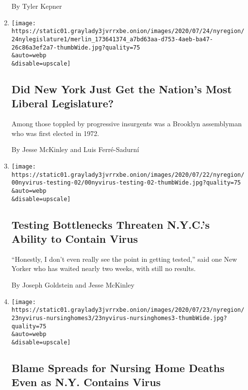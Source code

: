 \begin{enumerate}
  By Tyler Kepner
\item
  \href{/2020/07/24/nyregion/progressive-primaries-ny-legislature.html}{}

  \texttt{[image: https://static01.graylady3jvrrxbe.onion/images/2020/07/24/nyregion/24nylegislature1/merlin\_173641374\_a7bd63aa-d753-4aeb-ba47-26c86a3ef2a7-thumbWide.jpg?quality=75\\\&auto=webp\\\&disable=upscale]}

  \hypertarget{did-new-york-just-get-the-nations-most-liberal-legislature}{%
  \subsection{Did New York Just Get the Nation's Most Liberal
  Legislature?}\label{did-new-york-just-get-the-nations-most-liberal-legislature}}

  Among those toppled by progressive insurgents was a Brooklyn
  assemblyman who was first elected in 1972.

  By Jesse McKinley and Luis Ferré-Sadurní
\item
  \href{/2020/07/23/nyregion/coronavirus-testing-nyc.html}{}

  \texttt{[image: https://static01.graylady3jvrrxbe.onion/images/2020/07/22/nyregion/00nyvirus-testing-02/00nyvirus-testing-02-thumbWide.jpg?quality=75\\\&auto=webp\\\&disable=upscale]}

  \hypertarget{testing-bottlenecks-threaten-nycs-ability-to-contain-virus}{%
  \subsection{Testing Bottlenecks Threaten N.Y.C.'s Ability to Contain
  Virus}\label{testing-bottlenecks-threaten-nycs-ability-to-contain-virus}}

  ``Honestly, I don't even really see the point in getting tested,''
  said one New Yorker who has waited nearly two weeks, with still no
  results.

  By Joseph Goldstein and Jesse McKinley
\item
  \href{/2020/07/23/nyregion/nursing-homes-deaths-cuomo.html}{}

  \texttt{[image: https://static01.graylady3jvrrxbe.onion/images/2020/07/23/nyregion/23nyvirus-nursinghomes3/23nyvirus-nursinghomes3-thumbWide.jpg?quality=75\\\&auto=webp\\\&disable=upscale]}

  \hypertarget{blame-spreads-for-nursing-home-deaths-even-as-ny-contains-virus}{%
  \subsection{Blame Spreads for Nursing Home Deaths Even as N.Y.
  Contains
  Virus}\label{blame-spreads-for-nursing-home-deaths-even-as-ny-contains-virus}}


\end{enumerate}
